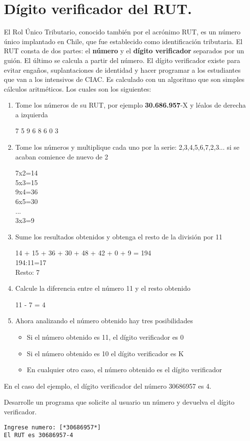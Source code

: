 \section{Dígito verificador del RUT.}

El Rol Único Tributario, conocido también por el acrónimo RUT, es un número único implantado en Chile, que fue establecido como identificación tributaria. El RUT consta de dos partes: el \textbf{número} y el \textbf{dígito verificador} separados por un guión. El último se calcula a partir del número. El dígito verificador existe para evitar engaños, suplantaciones de identidad y hacer programar a los estudiantes que van a los intensivos de CIAC. Es calculado con un algoritmo que son simples cálculos aritméticos. Los cuales son los siguientes:
\begin{enumerate}
	\item Tome los números de su RUT, por ejemplo \textbf{30.686.957}-X y léalos de derecha a izquierda
	\begin{center}
		7 5 9 6 8 6 0 3
	\end{center}

	\item Tome los números y multiplique cada uno por la serie: 2,3,4,5,6,7,2,3... si se acaban comience de nuevo de 2
	\begin{center}
		7x2=14\\
		5x3=15\\
		9x4=36\\
		6x5=30\\
		...\\
		3x3=9
	\end{center}
	\item Sume los resultados obtenidos y obtenga el resto de la división por 11
	\begin{center}
		14 + 15 + 36 + 30 + 48 + 42 + 0 + 9 = 194 \\
		194:11=17 \\
		Resto: 7
	\end{center}
	\item Calcule la diferencia entre el número 11 y el resto obtenido
	\begin{center}
		11 - 7 = 4
	\end{center}
	\item Ahora analizando el número obtenido hay tres posibilidades
	\begin{itemize}
		\item Si el número obtenido es 11, el dígito verificador es 0
		\item Si el número obtenido es 10 el dígito verificador es K
		\item En cualquier otro caso, el número obtenido es el dígito verificador
	\end{itemize}
\end{enumerate}

En el caso del ejemplo, el dígito verificador del número 30686957 es 4.

Desarrolle un programa que solicite al usuario un número y devuelva el dígito verificador.
\begin{lstlisting}[style=consola]
Ingrese numero: [*30686957*]
El RUT es 30686957-4
\end{lstlisting}
